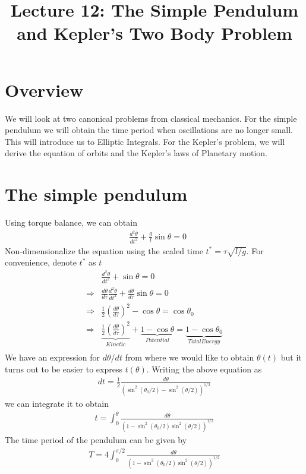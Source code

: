 \documentclass[11pt,a4paper]{article}
\title{Lecture 12: The Simple Pendulum and Kepler's Two Body Problem}
\date{\displaydate{date}}
\author{}
\newcommand{\1}{\vect{1}}
\newcommand{\dd}[2]{\frac{d #1}{d #2}}
\newcommand{\RA}{\Rightarrow}
\begin{document}
\maketitle
\section*{Overview}
We will look at two canonical problems from classical mechanics. For the simple pendulum we will obtain the time period when oscillations are no longer small. This will introduce us to Elliptic Integrals. For the Kepler's problem, we will derive the equation of orbits and the Kepler's laws of Planetary motion.

\section{The simple pendulum}
Using torque balance, we can obtain
\begin{align*}
& \dd{^2\theta}{t^2} + \frac{g}{l} \sin\theta = 0
\end{align*}
Non-dimensionalize the equation using the scaled time $t^* = \tau\sqrt{l/g}$. For convenience, denote $t^*$ as $t$
\begin{align*}
& \dd{^2\theta}{t^2} + \sin\theta = 0\\
\RA & \dd{\theta}{\tau} \dd{^2\theta}{t^2} + \dd{\theta}{\tau} \sin\theta = 0\\
\RA & \frac{1}{2}(\dd{\theta}{\tau})^2 - \cos\theta = \cos\theta_0 \tag{Integrating}\\
\RA & \underbrace{\frac{1}{2}(\dd{\theta}{\tau})^2}_{Kinetic} + \underbrace{1 - \cos\theta}_{Potential} = \underbrace{1 - \cos\theta_0}_{Total Energy} \\
\end{align*}
We have an expression for $d\theta/dt$ from where we would like to obtain $\theta(t)$ but it turns out to be easier to express $t(\theta)$. Writing the above equation as
\begin{align*}
dt = \frac{1}{2}\frac{d \theta}{(\sin^2(\theta_0/2) - \sin^2(\theta/2))^{1/2}}
\end{align*}
we can integrate it to obtain 
\begin{align*}
t = \int_0^\theta \frac{d\theta}{(1-\sin^2(\theta_0/2) \sin^2(\theta/2))^{1/2}}
\end{align*}
The time period of the pendulum can be given by
\begin{align*}
T = 4\int_0^{\pi/2} \frac{d\theta}{(1-\sin^2(\theta_0/2) \sin^2(\theta/2))^{1/2}}
\end{align*}
\end{document}
